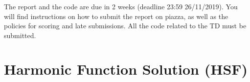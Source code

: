 \documentclass[a4paper, 11pt]{report}
\begin{document}

\maketitle

\vspace*{1.5cm}

The report and the code are due in 2 weeks (deadline 23:59 26/11/2019). You will find instructions on how to submit the report on piazza, as well as the policies for scoring and late submissions. All the code related to the TD must be submitted.

\chapter{Harmonic Function Solution (HSF)}
\end{document}
